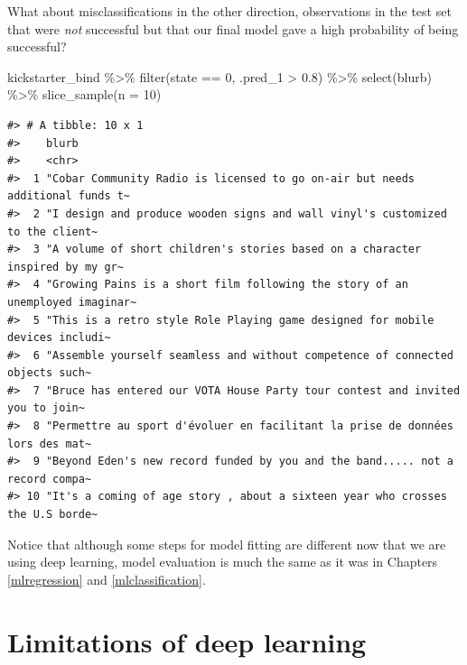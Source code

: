 \documentclass[
]{krantz}
\makeatletter
\newenvironment{Shaded}{\begin{snugshade}}{\end{snugshade}}
\newcommand{\AttributeTok}[1]{\textcolor[rgb]{0.77,0.63,0.00}{#1}}
\newcommand{\DecValTok}[1]{\textcolor[rgb]{0.00,0.00,0.81}{#1}}
\newcommand{\FloatTok}[1]{\textcolor[rgb]{0.00,0.00,0.81}{#1}}
\newcommand{\FunctionTok}[1]{\textcolor[rgb]{0.00,0.00,0.00}{#1}}
\newcommand{\NormalTok}[1]{#1}
\newcommand{\SpecialCharTok}[1]{\textcolor[rgb]{0.00,0.00,0.00}{#1}}
\newenvironment{kframe}{%
\medskip{}
\setlength{\fboxsep}{.8em}
 \def\at@end@of@kframe{}%
 \ifinner\ifhmode%
  \def\at@end@of@kframe{\end{minipage}}%
  \begin{minipage}{\columnwidth}%
 \fi\fi%
 \def\FrameCommand##1{\hskip\@totalleftmargin \hskip-\fboxsep
 \colorbox{shadecolor}{##1}\hskip-\fboxsep
     \hskip-\linewidth \hskip-\@totalleftmargin \hskip\columnwidth}%
 \MakeFramed {\advance\hsize-\width
   \@totalleftmargin\z@ \linewidth\hsize
   \@setminipage}}%
 {\par\unskip\endMakeFramed%
 \at@end@of@kframe}
\renewenvironment{Shaded}{\begin{kframe}}{\end{kframe}}
\makeatother
\begin{document}
What about misclassifications in the other direction, observations in the test set that were \emph{not} successful but that our final model gave a high probability of being successful?

\begin{Shaded}
\begin{Highlighting}[]
\NormalTok{kickstarter\_bind }\SpecialCharTok{\%\textgreater{}\%}
  \FunctionTok{filter}\NormalTok{(state }\SpecialCharTok{==} \DecValTok{0}\NormalTok{, .pred\_1 }\SpecialCharTok{\textgreater{}} \FloatTok{0.8}\NormalTok{) }\SpecialCharTok{\%\textgreater{}\%}
  \FunctionTok{select}\NormalTok{(blurb) }\SpecialCharTok{\%\textgreater{}\%}
  \FunctionTok{slice\_sample}\NormalTok{(}\AttributeTok{n =} \DecValTok{10}\NormalTok{)}
\end{Highlighting}
\end{Shaded}

\begin{verbatim}
#> # A tibble: 10 x 1
#>    blurb                                                                        
#>    <chr>                                                                        
#>  1 "Cobar Community Radio is licensed to go on-air but needs additional funds t~
#>  2 "I design and produce wooden signs and wall vinyl's customized to the client~
#>  3 "A volume of short children's stories based on a character inspired by my gr~
#>  4 "Growing Pains is a short film following the story of an unemployed imaginar~
#>  5 "This is a retro style Role Playing game designed for mobile devices includi~
#>  6 "Assemble yourself seamless and without competence of connected objects such~
#>  7 "Bruce has entered our VOTA House Party tour contest and invited you to join~
#>  8 "Permettre au sport d'évoluer en facilitant la prise de données lors des mat~
#>  9 "Beyond Eden's new record funded by you and the band..... not a record compa~
#> 10 "It's a coming of age story , about a sixteen year who crosses the U.S borde~
\end{verbatim}

Notice that although some steps for model fitting are different now that we are using deep learning, model evaluation is much the same as it was in Chapters \ref{mlregression} and \ref{mlclassification}.

\hypertarget{dllimitations}{%
\section{Limitations of deep learning}\label{dllimitations}}
\end{document}
